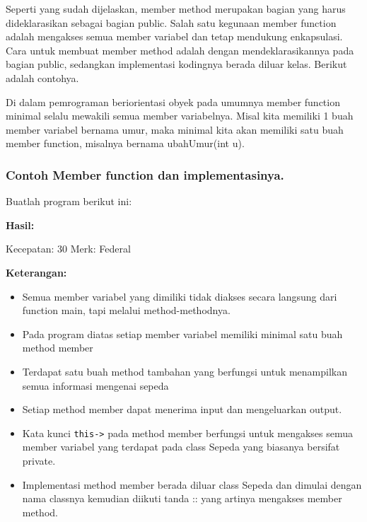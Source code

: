 Seperti yang sudah dijelaskan, member method merupakan bagian yang harus
dideklarasikan sebagai bagian public. Salah satu kegunaan member
function adalah mengakses semua member variabel dan tetap mendukung
enkapsulasi. Cara untuk membuat member method adalah dengan
mendeklarasikannya pada bagian public, sedangkan implementasi kodingnya
berada diluar kelas. Berikut adalah contohya.



Di dalam pemrograman beriorientasi obyek pada umumnya member function
minimal selalu mewakili semua member variabelnya. Misal kita memiliki 1
buah member variabel bernama umur, maka minimal kita akan memiliki satu
buah member function, misalnya bernama ubahUmur(int u).

\subsubsection*{Contoh Member function dan implementasinya.}

Buatlah program berikut ini:



\textbf{Hasil:}
\begin{lcverbatim}
Kecepatan: 30
Merk: Federal
\end{lcverbatim}


\textbf{Keterangan:}

\begin{itemize}

\item
 Semua member variabel yang dimiliki tidak diakses secara langsung dari
 function main, tapi melalui method-methodnya.
\item
 Pada program diatas setiap member variabel memiliki minimal satu buah
 method member
\item
 Terdapat satu buah method tambahan yang berfungsi untuk menampilkan
 semua informasi mengenai sepeda
\item
 Setiap method member dapat menerima input dan mengeluarkan output.
\item
 Kata kunci \texttt{this-\textgreater{}} pada method member berfungsi
 untuk mengakses semua member variabel yang terdapat pada class Sepeda
 yang biasanya bersifat private.
\item
 Implementasi method member berada diluar class Sepeda dan dimulai
 dengan nama classnya kemudian diikuti tanda :: yang artinya mengakses
 member method.
\end{itemize}

